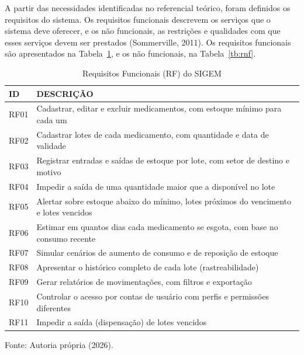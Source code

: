 \documentclass[12pt,a4paper]{article}
\begin{document}
A partir das necessidades identificadas no referencial teórico, foram definidos os requisitos do sistema. Os requisitos funcionais descrevem os serviços que o sistema deve oferecer, e os não funcionais, as restrições e qualidades com que esses serviços devem ser prestados (Sommerville, 2011). Os requisitos funcionais são apresentados na Tabela~\ref{tb:rf}, e os não funcionais, na Tabela~\ref{tb:rnf}.

\begin{table}[!htbp]
  \centering
  \caption{Requisitos Funcionais (RF) do SIGEM}
  \label{tb:rf}
  \small
  \renewcommand{\arraystretch}{1.15}
  \begin{tabularx}{\textwidth}{|l|X|}
    \hline
    \textbf{ID} & \textbf{DESCRIÇÃO} \\ \hline
    RF01 & Cadastrar, editar e excluir medicamentos, com estoque mínimo para cada um \\ \hline
    RF02 & Cadastrar lotes de cada medicamento, com quantidade e data de validade \\ \hline
    RF03 & Registrar entradas e saídas de estoque por lote, com setor de destino e motivo \\ \hline
    RF04 & Impedir a saída de uma quantidade maior que a disponível no lote \\ \hline
    RF05 & Alertar sobre estoque abaixo do mínimo, lotes próximos do vencimento e lotes vencidos \\ \hline
    RF06 & Estimar em quantos dias cada medicamento se esgota, com base no consumo recente \\ \hline
    RF07 & Simular cenários de aumento de consumo e de reposição de estoque \\ \hline
    RF08 & Apresentar o histórico completo de cada lote (rastreabilidade) \\ \hline
    RF09 & Gerar relatórios de movimentações, com filtros e exportação \\ \hline
    RF10 & Controlar o acesso por contas de usuário com perfis e permissões diferentes \\ \hline
    RF11 & Impedir a saída (dispensação) de lotes vencidos \\ \hline
  \end{tabularx}
  \par\smallskip
  {\small Fonte: Autoria própria (2026).}
\end{table}
\end{document}
